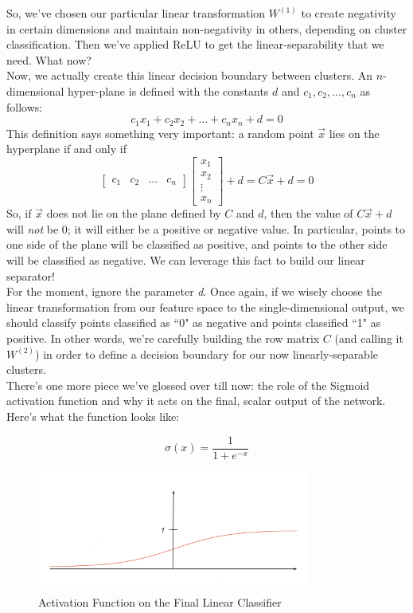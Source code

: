 \documentclass{article}
\begin{document}
So, we've chosen our particular linear transformation $W^{(1)}$ to create negativity in certain dimensions and maintain non-negativity in others, depending on cluster classification. Then we've applied ReLU to get the linear-separability that we need. What now? \\

Now, we actually create this linear decision boundary between clusters. An $n$-dimensional hyper-plane is defined with the constants $d$ and $c_1, c_2, ..., c_n$ as follows:
\[c_1 x_1 + c_2 x_2 + ... + c_n x_n + d = 0\]
This definition says something very important: a random point $\vec{x}$ lies on the hyperplane if and only if
\[\begin{bmatrix}c_1 & c_2 & ... & c_n\end{bmatrix} \begin{bmatrix}x_1 \\ x_2 \\ \vdots \\ x_n\end{bmatrix} + d = C\vec{x} + d = 0\]
So, if $\vec{x}$ does not lie on the plane defined by $C$ and $d$, then the value of $C\vec{x} + d$ will \textit{not} be 0; it will either be a positive or negative value. In particular, points to one side of the plane will be classified as positive, and points to the other side will be classified as negative. We can leverage this fact to build our linear separator!\\

For the moment, ignore the parameter \textit{d}. Once again, if we wisely choose the linear transformation from our feature space to the single-dimensional output, we should classify points classified as ``0" as negative and points classified ``1" as positive. In other words, we're carefully building the row matrix $C$ (and calling it $W^{(2)}$) in order to define a decision boundary for our now linearly-separable clusters. \\

There's one more piece we've glossed over till now: the role of the Sigmoid activation function and why it acts on the final, scalar output of the network. Here's what the function looks like:

$$\sigma(x) = \frac{1}{1 + e^{-x}}$$
\begin{figure}[htp]
    \centering
    \includegraphics[width=9cm]{sigmoid.png}
    \caption{Activation Function on the Final Linear Classifier}
\end{figure}
\end{document}

